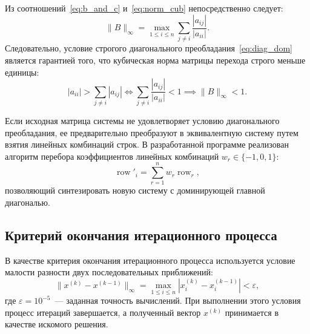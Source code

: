 Из соотношений~\eqref{eq:b_and_c} и~\eqref{eq:norm_cub} непосредственно следует:
\begin{equation}
    \|B\|_\infty = \max_{1 \le i \le n} \sum_{j \neq i} \frac{|a_{ij}|}{|a_{ii}|}.
\end{equation}
Следовательно, условие строгого диагонального преобладания~\eqref{eq:diag_dom} является гарантией того, что кубическая норма матрицы перехода строго меньше единицы:
\begin{equation}
    |a_{ii}| > \sum_{j \neq i} |a_{ij}| \iff \sum_{j \neq i} \frac{|a_{ij}|}{|a_{ii}|} < 1 \implies \|B\|_\infty < 1.
\end{equation}

Если исходная матрица системы не удовлетворяет условию диагонального преобладания, ее предварительно преобразуют в эквивалентную систему путем взятия линейных комбинаций строк. В разработанной программе реализован алгоритм перебора коэффициентов линейных комбинаций $w_r \in \{-1, 0, 1\}$:
\begin{equation}
    \operatorname{row}'_i = \sum_{r=1}^n w_r \operatorname{row}_r,
\end{equation}
позволяющий синтезировать новую систему с доминирующей главной диагональю.

\subsection{Критерий окончания итерационного процесса}

В качестве критерия окончания итерационного процесса используется условие малости разности двух последовательных приближений:
\begin{equation}
    \|x^{(k)} - x^{(k-1)}\|_\infty = \max_{1 \le i \le n} |x_i^{(k)} - x_i^{(k-1)}| < \varepsilon,
    \label{eq:stop_crit}
\end{equation}
где $\varepsilon = 10^{-5}$~--- заданная точность вычислений. При выполнении этого условия процесс итераций завершается, а полученный вектор $x^{(k)}$ принимается в качестве искомого решения.
